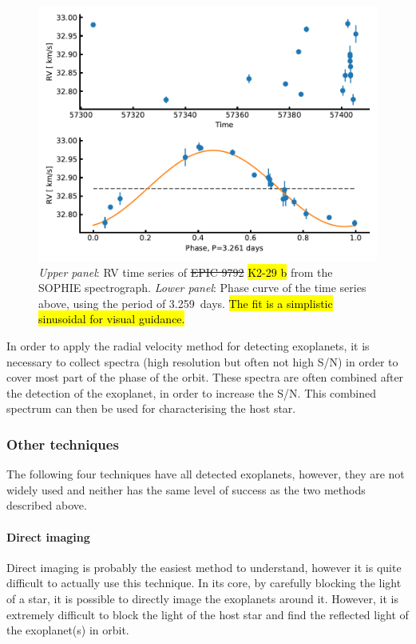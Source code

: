 \begin{figure}[htpb!]
    \centering
    \includegraphics[width=1.0\linewidth]{figures/RVmethod.pdf}
    \caption{\emph{Upper panel}: RV time series of \st{EPIC 9792} \hl{K2-29 b} from the SOPHIE spectrograph.
             \emph{Lower panel}: Phase curve of the time series above, using the period of
             \SI{3.259}{days}. \hl{The fit is a simplistic sinusoidal for visual guidance.}}
    \label{fig:rvmethod}
\end{figure}

In order to apply the radial velocity method for detecting exoplanets, it is necessary to collect
spectra (high resolution but often not high S/N) in order to cover most part of the phase of the
orbit. These spectra are often combined after the detection of the exoplanet, in order to increase
the S/N. This combined spectrum can then be used for characterising the host star.


\subsubsection{Other techniques}

The following four techniques have all detected exoplanets, however, they are not widely used and
neither has the same level of success as the two methods described above.

\paragraph{Direct imaging}

Direct imaging is probably the easiest method to understand, however it is quite difficult to
actually use this technique. In its core, by carefully blocking the light of a star, it is possible
to directly image the exoplanets around it. However, it is extremely difficult to block the light
of the host star and find the reflected light of the exoplanet(s) in orbit.

